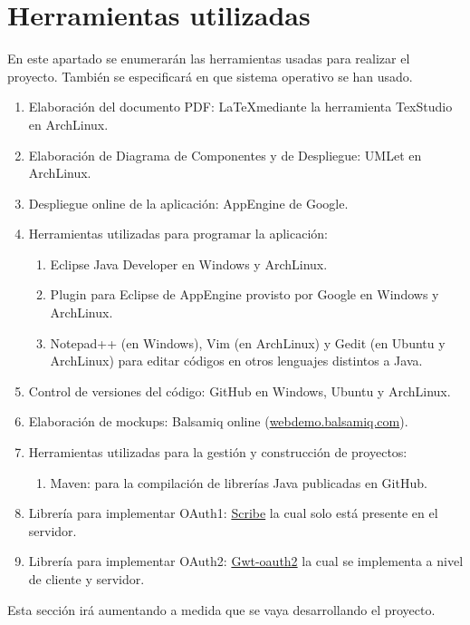\documentclass{scrartcl}
\begin{document}
\section{Herramientas utilizadas}\label{cap:herramientas}
En este apartado se enumerarán las herramientas usadas para realizar el proyecto. También se especificará en que sistema operativo se han usado. 

\begin{enumerate}[\textbf{\textperiodcentered}]
	\item Elaboración del documento PDF: \LaTeX  mediante la herramienta TexStudio en ArchLinux.
	\item Elaboración de Diagrama de Componentes y de Despliegue: UMLet en ArchLinux.
	\item Despliegue online de la aplicación: AppEngine de Google.
	\item Herramientas utilizadas para programar la aplicación:
	\begin{enumerate}[\textbf{\textperiodcentered}]
		\item Eclipse Java Developer en Windows y ArchLinux.
		\item Plugin para Eclipse de AppEngine provisto por Google en Windows y ArchLinux.
		\item Notepad++ (en Windows), Vim (en ArchLinux) y Gedit (en Ubuntu y ArchLinux) para editar códigos en otros lenguajes distintos a Java.
	\end{enumerate}
	\item Control de versiones del código: GitHub en Windows, Ubuntu y ArchLinux.
	\item Elaboración de mockups: Balsamiq online (\href{http://webdemo.balsamiq.com}{webdemo.balsamiq.com}).
	\item Herramientas utilizadas para la gestión y construcción de proyectos:
	\begin{enumerate}[\textbf{\textperiodcentered}]
		\item Maven: para la compilación de librerías Java publicadas en GitHub.
	\end{enumerate}	
	\item Librería para implementar OAuth1: \href{https://github.com/fernandezpablo85/scribe-java}{Scribe} la cual solo está presente en el servidor.
	\item Librería para implementar OAuth2: \href{https://code.google.com/p/gwt-oauth2/}{Gwt-oauth2} la cual se implementa a nivel de cliente y servidor.

	
\end{enumerate}
Esta sección irá aumentando a medida que se vaya desarrollando el proyecto.
\end{document}
